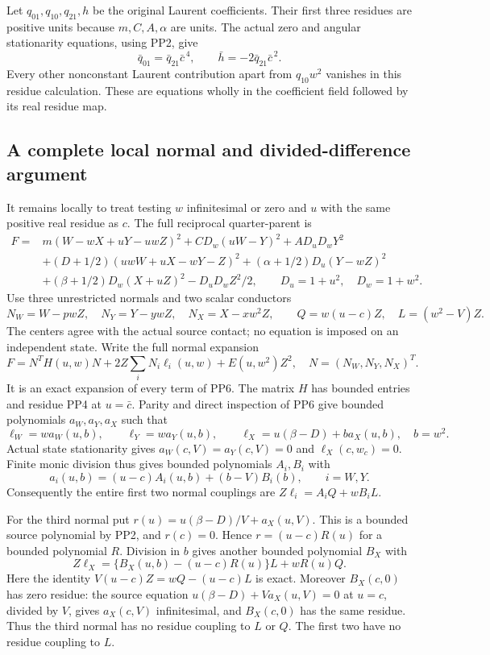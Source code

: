 Let $q_{01},q_{10},q_{21},h$ be the original Laurent coefficients.
Their first three residues are positive units because $m,C,A,\alpha$
are units. The actual zero and angular stationarity equations,
using PP2, give
\[
 \bar q_{01}=\bar q_{21}\bar c^{\,4},\qquad
 \bar h=-2\bar q_{21}\bar c^{\,2}.
 \tag{PP5}
\]
Every other nonconstant Laurent contribution apart from $q_{10}w^2$
vanishes in this residue calculation. These are equations wholly in
the coefficient field followed by its real residue map.

\subsection{A complete local normal and divided-difference argument}

It remains locally to treat testing $w$ infinitesimal or zero and
$u$ with the same positive real residue as $c$. The full reciprocal
quarter-parent is
\[
\begin{split}
 F={}&m(W-wX+uY-uwZ)^2+CD_w(uW-Y)^2+AD_uD_wY^2\\
 &+(D+1/2)(uwW+uX-wY-Z)^2
       +(\alpha+1/2)D_u(Y-wZ)^2\\
 &+(\beta+1/2)D_w(X+uZ)^2-D_uD_wZ^2/2,
 \qquad D_u=1+u^2,\quad D_w=1+w^2.
\end{split}\tag{PP6}
\]
Use three unrestricted normals and two scalar conductors
\[
 N_W=W-pwZ,\quad N_Y=Y-ywZ,\quad N_X=X-xw^2Z,
 \qquad Q=w(u-c)Z,\quad L=(w^2-V)Z.
 \tag{PP7}
\]
The centers agree with the actual source contact; no equation is
imposed on an independent state. Write the full normal expansion
\[
 F=N^TH(u,w)N+2Z\sum_iN_i\ell_i(u,w)+E(u,w^2)Z^2,
 \quad N=(N_W,N_Y,N_X)^T.
 \tag{PP8}
\]
It is an exact expansion of every term of PP6. The matrix $H$ has
bounded entries and residue PP4 at $u=\bar c$. Parity and direct
inspection of PP6 give bounded polynomials $a_W,a_Y,a_X$ such that
\[
 \ell_W=w a_W(u,b),\qquad \ell_Y=w a_Y(u,b),\qquad
 \ell_X=u(\beta-D)+b a_X(u,b),\quad b=w^2.
 \tag{PP9}
\]
Actual state stationarity gives $a_W(c,V)=a_Y(c,V)=0$ and
$\ell_X(c,w_c)=0$. Finite monic division thus gives bounded
polynomials $A_i,B_i$ with
\[
 a_i(u,b)=(u-c)A_i(u,b)+(b-V)B_i(b),\qquad i=W,Y.
\]
Consequently the entire first two normal couplings are
$Z\ell_i=A_iQ+wB_iL$.

For the third normal put
$r(u)=u(\beta-D)/V+a_X(u,V)$. This is a bounded source
polynomial by PP2, and $r(c)=0$. Hence $r=(u-c)R(u)$ for
a bounded polynomial $R$. Division in $b$ gives another bounded
polynomial $B_X$ with
\[
 Z\ell_X=\{B_X(u,b)-(u-c)R(u)\}L+wR(u)Q.
 \tag{PP10}
\]
Here the identity $V(u-c)Z=wQ-(u-c)L$ is exact. Moreover
$B_X(c,0)$ has zero residue: the source equation
$u(\beta-D)+Va_X(u,V)=0$ at $u=c$, divided by $V$,
gives $a_X(c,V)$ infinitesimal, and $B_X(c,0)$ has the same
residue. Thus the third normal has no residue coupling to $L$
or $Q$. The first two have no residue coupling to $L$.

